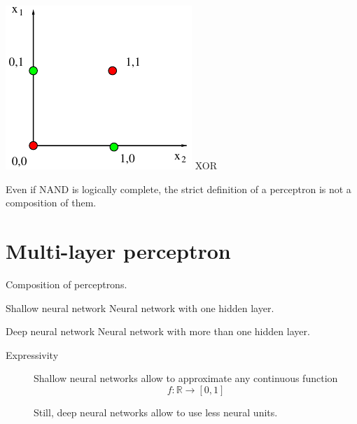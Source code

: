 \begin{description}
\begin{center}
\begin{minipage}{.2\textwidth}
                \centering
                \includegraphics[width=\textwidth]{img/_xor.pdf}
                \tiny XOR
            \end{minipage}
        \end{center}

        \begin{remark}
            Even if NAND is logically complete, the strict definition of a perceptron is not a composition of them.
        \end{remark}
\end{description}



\section{Multi-layer perceptron}

Composition of perceptrons.

\begin{descriptionlist}
    \item[Shallow neural network] 
        Neural network with one hidden layer.

    \item[Deep neural network] 
        Neural network with more than one hidden layer.
\end{descriptionlist}

\begin{description}
    \item[Expressivity] 
        Shallow neural networks allow to approximate any continuous function 
        \[ f: \mathbb{R} \rightarrow [0, 1] \]

        \begin{remark}
            Still, deep neural networks allow to use less neural units.
        \end{remark}
\end{description}


